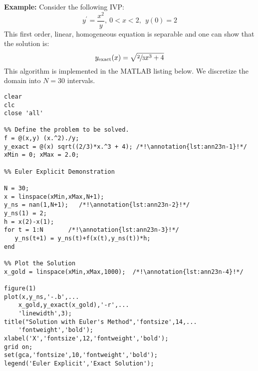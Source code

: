 \noindent\textbf{Example:} Consider the following IVP:
\begin{equation*}
y^{\prime} = \frac{x^2}{y}, \ 0 < x < 2, \ \ y(0) = 2
\end{equation*}
This first order, linear, homogeneous equation is separable and one can show that the solution is: 
\begin{equation}
y_{\text{exact}}(x) = \sqrt{\sfrac{2}{3}x^3 + 4}
\end{equation}
This algorithm is implemented in the MATLAB listing below. We discretize the domain into $N = 30$ intervals.
\begin{lstlisting}[style=myMatlab,name=lec23-ex1]
clear
clc
close 'all'

%% Define the problem to be solved.
f = @(x,y) (x.^2)./y;
y_exact = @(x) sqrt((2/3)*x.^3 + 4); /*!\annotation{lst:ann23n-1}!*/
xMin = 0; xMax = 2.0;

%% Euler Explicit Demonstration

N = 30;
x = linspace(xMin,xMax,N+1);
y_ns = nan(1,N+1);   /*!\annotation{lst:ann23n-2}!*/
y_ns(1) = 2;
h = x(2)-x(1);
for t = 1:N       /*!\annotation{lst:ann23n-3}!*/
   y_ns(t+1) = y_ns(t)+f(x(t),y_ns(t))*h; 
end

%% Plot the Solution
x_gold = linspace(xMin,xMax,1000);  /*!\annotation{lst:ann23n-4}!*/

figure(1)
plot(x,y_ns,'-.b',...
    x_gold,y_exact(x_gold),'-r',...
    'linewidth',3);
title("Solution with Euler's Method",'fontsize',14,...
    'fontweight','bold');
xlabel('X','fontsize',12,'fontweight','bold');
grid on;
set(gca,'fontsize',10,'fontweight','bold');
legend('Euler Explicit','Exact Solution');
\end{lstlisting}
